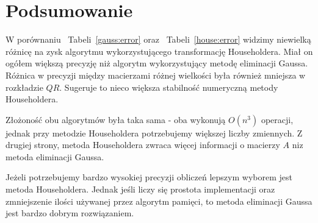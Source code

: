 \section{Podsumowanie}

W porównaniu ~Tabeli~\ref{gauss:error} oraz ~Tabeli~\ref{house:error} widzimy niewielką różnicę na zysk algorytmu wykorzystującego transformację Householdera. Miał on ogółem większą precyzję niż algorytm wykorzystujący metodę eliminacji Gaussa. Różnica w precyzji między macierzami różnej wielkości była również mniejsza w rozkładzie $QR$. Sugeruje to nieco większa stabilność numeryczną metody Householdera.

Złożoność obu algorytmów była taka sama - oba wykonują $O(n^3)$ operacji, jednak przy metodzie Householdera potrzebujemy większej liczby zmiennych. Z drugiej strony, metoda Householdera zwraca więcej informacji o macierzy $A$ niz metoda eliminacji Gaussa.

Jeżeli potrzebujemy bardzo wysokiej precyzji obliczeń lepszym wyborem jest metoda Householdera. Jednak jeśli liczy się prostota implementacji oraz zmniejszenie ilości używanej przez algorytm pamięci, to metoda eliminacji Gaussa jest bardzo dobrym rozwiązaniem.